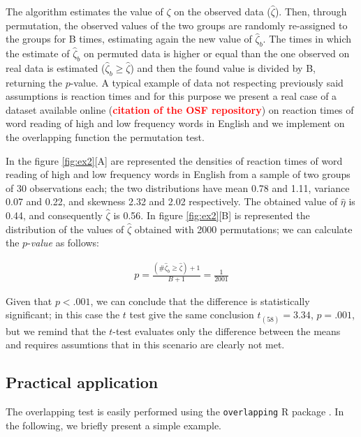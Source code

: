 \documentclass[twocolumn]{article}\usepackage[]{graphicx}\usepackage[]{xcolor}
\begin{document}
The algorithm estimates the value of $\zeta$ on the observed data ($\hat{\zeta}$). Then, through permutation, the observed values of the two groups are randomly re-assigned to the groups for B times, estimating again the new value of  $\hat{\zeta}_b$. The times in which the estimate of $\hat{\zeta}_b$ on permuted data is higher or equal than the one observed on real data is estimated ($\hat{\zeta}_b \geq \hat{\zeta}$) and then the found value is divided by B, returning the $p$-value. 
A typical example of data not respecting previously said assumptions is reaction times and for this purpose we present a real case of a dataset available online (\textcolor{red}{\textbf{citation of the OSF repository}}) on reaction times of word reading of high and low frequency words in English and we implement on the overlapping function the permutation test. 

In the figure \ref{fig:ex2}[A] are represented the densities of reaction times of word reading of high and low frequency words in English from a sample of two groups of 30 observations each; the two distributions have mean 0.78 and 1.11, variance 0.07 and 0.22, and skewness 2.32 and 2.02 respectively. The obtained value of $\hat{\eta}$ is 0.44, and consequently $\hat{\zeta}$ is 0.56. In figure \ref{fig:ex2}[B] is represented the distribution of the values of $\hat{\zeta}$ obtained with 2000 permutations; we can calculate the $p$-\emph{value} as follows:

\begin{eqnarray*}
p = \frac{(\# \hat{\zeta}_b \geq \hat{\zeta})+1 }{B+1} = \frac{1}{ 2001 } %
\end{eqnarray*}

Given that $p < .001$, we can conclude that the difference is statistically significant; in this case the $t$ test give the same conclusion $t_{(58)} = 3.34$, $p = .001$, but we remind that the $t$-test evaluates only the difference between the means and requires assumtions that in this scenario are clearly not met.

\subsection{Practical application}

The overlapping test is easily performed using the \texttt{overlapping} R package  \cite{overlapping:package}. In the following, we briefly present a simple example.  
\end{document}
